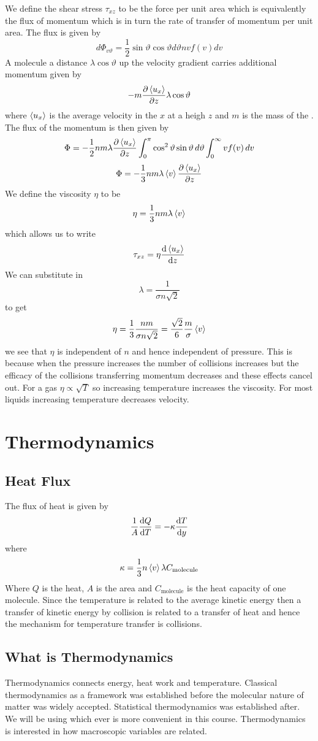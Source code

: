 \documentclass{article}
\begin{document}
    We define the shear stress \(\tau_{xz}\) to be the force per unit area which is equivalently the flux of momentum which is in turn the rate of transfer of momentum per unit area.
    The flux is given by
    \[d\Phi_{v\vartheta} = \frac{1}{2}\sin\vartheta\cos\vartheta d\vartheta nvf(v)dv\]
    A molecule a distance \(\lambda\cos\vartheta\) up the velocity gradient carries additional momentum given by
    \[-m\pdv{\left\langle{u_x}\right\rangle}{z}\lambda\cos\vartheta\]
    where \(\left\langle{u_x}\right\rangle\) is the average velocity in the \(x\) at a heigh \(z\) and \(m\) is the mass of the .
    The flux of the momentum is then given by
    \[\Phi = -\frac{1}{2}nm\lambda\pdv{\left\langle{u_x}\right\rangle}{z}\int_0^\pi\cos^2\vartheta\sin\vartheta\, d\vartheta\int_0^\infty vf(v)\,dv\]
    \[\Phi = -\frac{1}{3}nm\lambda\left\langle{v}\right\rangle\pdv{\left\langle{u_x}\right\rangle}{z}\]
    We define the viscosity \(\eta\) to be
    \[\eta = \frac{1}{3}nm\lambda\left\langle{v}\right\rangle\]
    which allows us to write
    \[\tau_{xz} = \eta\dv{\left\langle{u_x}\right\rangle}{z}\]
    We can substitute in
    \[\lambda = \frac{1}{\sigma n\sqrt 2}\]
    to get
    \[\eta = \frac{1}{3}\frac{nm}{\sigma n\sqrt 2} = \frac{\sqrt 2}{6}\frac{m}{\sigma}\left\langle{v}\right\rangle\]
    we see that \(\eta\) is independent of \(n\) and hence independent of pressure.
    This is because when the pressure increases the number of collisions increases but the efficacy of the collisions transferring momentum decreases and these effects cancel out.
    For a gas \(\eta\propto\sqrt T\) so increasing temperature increases the viscosity.
    For most liquids increasing temperature decreases velocity.
    
    \section{Thermodynamics}
    \subsection{Heat Flux}
    The flux of heat is given by
    \[\frac{1}{A}\dv{Q}{T} = -\kappa\dv{T}{y}\]
    where
    \[\kappa = \frac{1}{3}n\left\langle{v}\right\rangle\lambda C_\text{molecule}\]
    Where \(Q\) is the heat, \(A\) is the area and \(C_\text{molecule}\) is the heat capacity of one molecule.
    Since the temperature is related to the average kinetic energy then a transfer of kinetic energy by collision is related to a transfer of heat and hence the mechanism for temperature transfer is collisions.
    
    \subsection{What is Thermodynamics}
    Thermodynamics connects energy, heat work and temperature.
    Classical thermodynamics as a framework was established before the molecular nature of matter was widely accepted.
    Statistical thermodynamics was established after.
    We will be using which ever is more convenient in this course.
    Thermodynamics is interested in how macroscopic variables are related.
    
\end{document}
